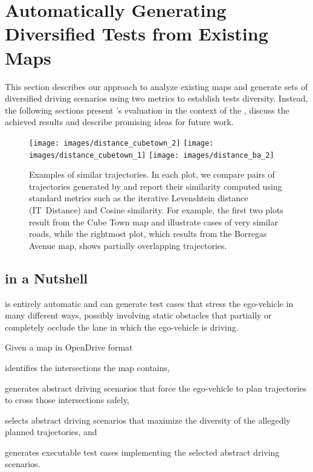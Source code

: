 \documentclass[conference]{IEEEtran}
\begin{document}
\section{Automatically Generating Diversified Tests from Existing Maps}
This section describes our approach to analyze existing maps and generate sets of diversified driving scenarios using two metrics to establish tests diversity. Instead, the following sections present \tool's evaluation in the context of the \challenge, discuss the achieved results and describe promising ideas for future work.

\begin{figure}[t]
\texttt{[image: images/distance\_cubetown\_2]}
\endminipage\hfill
{}
\texttt{[image: images/distance\_cubetown\_1]}
\endminipage\hfill
{}%
  \texttt{[image: images/distance\_ba\_2]}
\endminipage
\caption{Examples of similar trajectories. In each plot, we compare pairs of trajectories generated by \tool and report their similarity computed using standard metrics such as the iterative Levenshtein distance (IT~Distance) and Cosine similarity. For example, the first two plots result from the Cube Town map and illustrate cases of very similar roads, while the rightmost plot, which results from the Borregas Avenue map, shows partially overlapping trajectories.}
\label{fig:similarity}
\end{figure}


\subsection{\tool in a Nutshell}
\tool is entirely automatic and can generate test cases that stress the ego-vehicle in many different ways, possibly involving static obstacles that partially or completely occlude the lane in which the ego-vehicle is driving. 

Given a map in OpenDrive format \tool \begin{inparaenum}[(1)]
\item identifies the intersections the map contains, 
\item generates abstract driving scenarios that force the ego-vehicle to plan trajectories to cross those intersections safely, \item selects abstract driving scenarios that maximize the diversity of the allegedly planned trajectories, and \item generates executable test cases implementing the selected abstract driving scenarios.
\end{inparaenum}
\end{document}
